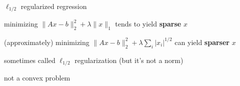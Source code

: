 \documentclass[aspectratio=169,11pt]{beamer}
\begin{document}

\begin{frame}{$\ell_{1/2}$ regularized regression}
\BIT
\item minimizing $\|Ax-b\|_2^2+\lambda \| x\|_1$ tends to yield \textbf{sparse} $x$
\item (approximately) 
minimizing $\|Ax-b\|_2^2+\lambda \sum_i |x_i|^{1/2}$ can yield \textbf{sparser} $x$
\item sometimes called $\ell_{1/2}$ regularization (but it's not a norm)
\item not a convex problem
\EIT
\end{frame}
\end{document}
